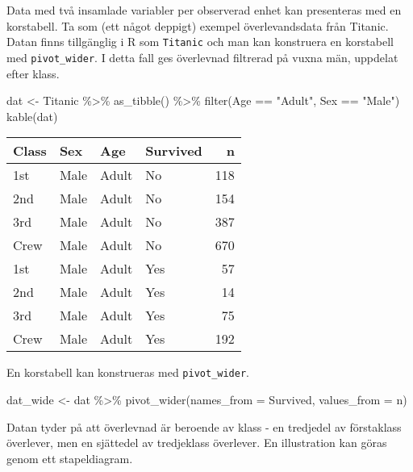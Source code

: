 \documentclass[
]{book}
\newenvironment{Shaded}{\begin{snugshade}}{\end{snugshade}}
\newcommand{\AttributeTok}[1]{\textcolor[rgb]{0.77,0.63,0.00}{#1}}
\newcommand{\FunctionTok}[1]{\textcolor[rgb]{0.00,0.00,0.00}{#1}}
\newcommand{\NormalTok}[1]{#1}
\newcommand{\OtherTok}[1]{\textcolor[rgb]{0.56,0.35,0.01}{#1}}
\newcommand{\SpecialCharTok}[1]{\textcolor[rgb]{0.00,0.00,0.00}{#1}}
\newcommand{\StringTok}[1]{\textcolor[rgb]{0.31,0.60,0.02}{#1}}
\theoremstyle{definition}
\theoremstyle{definition}
\theoremstyle{definition}
\theoremstyle{definition}
\theoremstyle{remark}
\begin{document}
Data med två insamlade variabler per observerad enhet kan presenteras med en korstabell. Ta som (ett något deppigt) exempel överlevandsdata från Titanic. Datan finns tillgänglig i R som \texttt{Titanic} och man kan konstruera en korstabell med \texttt{pivot\_wider}. I detta fall ges överlevnad filtrerad på vuxna män, uppdelat efter klass.

\begin{Shaded}
\begin{Highlighting}[]
\NormalTok{dat }\OtherTok{\textless{}{-}}\NormalTok{ Titanic }\SpecialCharTok{\%\textgreater{}\%} 
  \FunctionTok{as\_tibble}\NormalTok{() }\SpecialCharTok{\%\textgreater{}\%} 
  \FunctionTok{filter}\NormalTok{(Age }\SpecialCharTok{==} \StringTok{"Adult"}\NormalTok{, Sex }\SpecialCharTok{==} \StringTok{"Male"}\NormalTok{)}
\FunctionTok{kable}\NormalTok{(dat)}
\end{Highlighting}
\end{Shaded}

\begin{table}
\centering
\begin{tabular}[t]{llllr}
\toprule
Class & Sex & Age & Survived & n\\
\midrule
1st & Male & Adult & No & 118\\
2nd & Male & Adult & No & 154\\
3rd & Male & Adult & No & 387\\
Crew & Male & Adult & No & 670\\
1st & Male & Adult & Yes & 57\\
\addlinespace
2nd & Male & Adult & Yes & 14\\
3rd & Male & Adult & Yes & 75\\
Crew & Male & Adult & Yes & 192\\
\bottomrule
\end{tabular}
\end{table}

En korstabell kan konstrueras med \texttt{pivot\_wider}.

\begin{Shaded}
\begin{Highlighting}[]
\NormalTok{dat\_wide }\OtherTok{\textless{}{-}}\NormalTok{ dat }\SpecialCharTok{\%\textgreater{}\%} 
  \FunctionTok{pivot\_wider}\NormalTok{(}\AttributeTok{names\_from =}\NormalTok{ Survived, }\AttributeTok{values\_from =}\NormalTok{ n)}
\end{Highlighting}
\end{Shaded}

Datan tyder på att överlevnad är beroende av klass - en tredjedel av förstaklass överlever, men en sjättedel av tredjeklass överlever. En illustration kan göras genom ett stapeldiagram.
\end{document}
